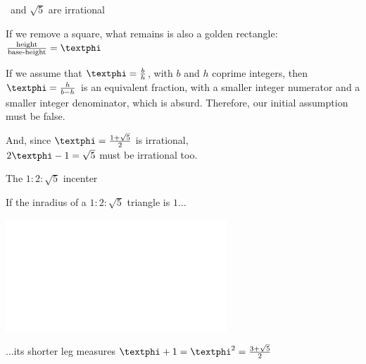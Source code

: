 \documentclass[14pt]{beamer}
\begin{document}
\begin{frame}{\textphi\ and $\sqrt{5}$ are irrational}
\begin{center}
\begin{minipage}{0.5\textwidth}
                If we remove a square, what remains is also a golden rectangle: $\tfrac{\text{height}}{\text{base-height}} = \text{\textphi}$\bigskip

                If we assume that $\text{\textphi} = \tfrac{b}{h}$, with $b$ and $h$ coprime integers, then $\text{\textphi} = \tfrac{h}{b-h}$ is an equivalent fraction, with a smaller integer numerator and a smaller integer denominator, which is absurd. Therefore, our initial assumption must be false.\bigskip

                And, since $\text{\textphi} =\tfrac{1+\sqrt{5}}{2}$ is irrational,\\[0.25ex]$2\text{\textphi} - 1 = \sqrt{5}$ must be irrational too.
            \end{minipage}
        \end{center}
    \end{frame}


    \begin{frame}{The $1\!\!:\!\!2\!\!:\!\!\sqrt{5}$ incenter}
        \begin{center}
            If the inradius of a $1\!\!:\!\!2\!\!:\!\!\sqrt{5}$ triangle is $1$...

            \bigskip \bigskip

            \includegraphics[height=18ex]{figures/figure006a.pdf}

            \bigskip \bigskip

            ...its shorter leg measures $\text{\textphi}+1 = \text{\textphi}^2 = \frac{3+\sqrt{5}}{2}$
        \end{center}
    \end{frame}

\end{document}
